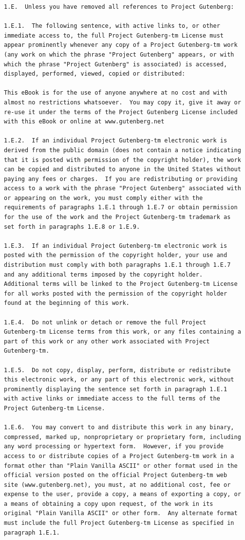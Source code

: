 \documentclass[a4paper,12pt]{book}[2004/02/16]
\theoremstyle{ilemma}
\theoremstyle{itheorem}
\theoremstyle{iother}
\theoremstyle{icorollary}
\theoremstyle{numcorollary}
\theoremstyle{idefinition}
\begin{document}
\begin{verbatim}
1.E.  Unless you have removed all references to Project Gutenberg:

1.E.1.  The following sentence, with active links to, or other
immediate access to, the full Project Gutenberg-tm License must
appear prominently whenever any copy of a Project Gutenberg-tm work
(any work on which the phrase "Project Gutenberg" appears, or with
which the phrase "Project Gutenberg" is associated) is accessed,
displayed, performed, viewed, copied or distributed:

This eBook is for the use of anyone anywhere at no cost and with
almost no restrictions whatsoever.  You may copy it, give it away or
re-use it under the terms of the Project Gutenberg License included
with this eBook or online at www.gutenberg.net

1.E.2.  If an individual Project Gutenberg-tm electronic work is
derived from the public domain (does not contain a notice indicating
that it is posted with permission of the copyright holder), the work
can be copied and distributed to anyone in the United States without
paying any fees or charges.  If you are redistributing or providing
access to a work with the phrase "Project Gutenberg" associated with
or appearing on the work, you must comply either with the
requirements of paragraphs 1.E.1 through 1.E.7 or obtain permission
for the use of the work and the Project Gutenberg-tm trademark as
set forth in paragraphs 1.E.8 or 1.E.9.

1.E.3.  If an individual Project Gutenberg-tm electronic work is
posted with the permission of the copyright holder, your use and
distribution must comply with both paragraphs 1.E.1 through 1.E.7
and any additional terms imposed by the copyright holder.
Additional terms will be linked to the Project Gutenberg-tm License
for all works posted with the permission of the copyright holder
found at the beginning of this work.

1.E.4.  Do not unlink or detach or remove the full Project
Gutenberg-tm License terms from this work, or any files containing a
part of this work or any other work associated with Project
Gutenberg-tm.

1.E.5.  Do not copy, display, perform, distribute or redistribute
this electronic work, or any part of this electronic work, without
prominently displaying the sentence set forth in paragraph 1.E.1
with active links or immediate access to the full terms of the
Project Gutenberg-tm License.

1.E.6.  You may convert to and distribute this work in any binary,
compressed, marked up, nonproprietary or proprietary form, including
any word processing or hypertext form.  However, if you provide
access to or distribute copies of a Project Gutenberg-tm work in a
format other than "Plain Vanilla ASCII" or other format used in the
official version posted on the official Project Gutenberg-tm web
site (www.gutenberg.net), you must, at no additional cost, fee or
expense to the user, provide a copy, a means of exporting a copy, or
a means of obtaining a copy upon request, of the work in its
original "Plain Vanilla ASCII" or other form.  Any alternate format
must include the full Project Gutenberg-tm License as specified in
paragraph 1.E.1.


\end{verbatim}
\end{document}
